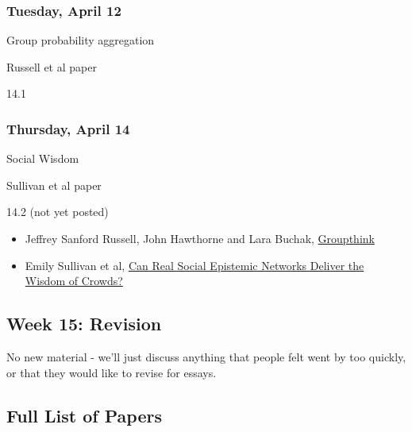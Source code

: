 \documentclass[
]{article}
\providecommand{\tightlist}{%
  \setlength{\itemsep}{0pt}\setlength{\parskip}{0pt}}
\begin{document}
\begin{multicols}{2}

\hypertarget{tuesday-april-12}{%
\subsubsection{Tuesday, April 12}\label{tuesday-april-12}}

\begin{description}
\tightlist
\item[Topic]
Group probability aggregation
\item[Reading]
Russell et al paper
\item[Video lectures]
14.1
\end{description}

\hypertarget{thursday-april-14}{%
\subsubsection{Thursday, April 14}\label{thursday-april-14}}

\begin{description}
\tightlist
\item[Topic]
Social Wisdom
\item[Reading]
Sullivan et al paper
\item[Video lectures]
14.2 (not yet posted)
\end{description}

\end{multicols}

\begin{itemize}
\tightlist
\item
  Jeffrey Sanford Russell, John Hawthorne and Lara Buchak,
  \href{https://philpapers.org/rec/RUSG}{Groupthink}
\item
  Emily Sullivan et al,
  \href{https://philarchive.org/archive/SULCRS}{Can Real Social
  Epistemic Networks Deliver the Wisdom of Crowds?}
\end{itemize}

\hypertarget{week-15-revision}{%
\subsection{Week 15: Revision}\label{week-15-revision}}

No new material - we'll just discuss anything that people felt went by
too quickly, or that they would like to revise for essays.

\newpage

\hypertarget{full-list-of-papers}{%
\subsection{Full List of Papers}\label{full-list-of-papers}}
\end{document}
